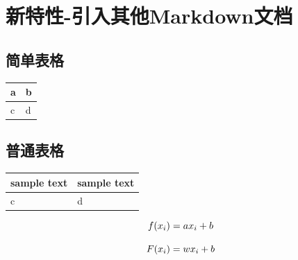 \documentclass[UTF8]{ctexart}
\newenvironment{marktext}{}{}
\renewenvironment{shaded}{
                     \def\FrameCommand{\fboxsep=\FrameSep \colorbox{shadecolor}}
                     \MakeFramed{\advance\hsize-\width \FrameRestore\FrameRestore}}
                    {\endMakeFramed}
\newlength\tablewidth
\begin{document}
\begin{marktext}


\section{新特性{-}引入其他Markdown文档}




\normalsize
\begin{marktext}


\subsection{简单表格}


\end{marktext}
\begin{center}
\setlength\tablewidth{\dimexpr (\textwidth -4\tabcolsep)}
\begin{tabular}{|p{0.500\tablewidth}<{\centering}|p{0.500\tablewidth}<{\centering}|}
\hline
\rowcolor{tabletopgray}
\textbf{a}&\textbf{b}\\
\hline
c&d\\
\hline
\end{tabular}
\end{center}
\begin{marktext}


\subsection{普通表格}


\end{marktext}
\begin{center}
\setlength\tablewidth{\dimexpr (\textwidth -4\tabcolsep)}
\begin{tabular}{|p{0.500\tablewidth}<{\centering}|p{0.500\tablewidth}<{\centering}|}
\hline
\rowcolor{tabletopgray}
\textbf{sample text }&\textbf{ sample text}\\
\hline
c&d\\
\hline
\end{tabular}
\end{center}


\normalsize


\[
f(x_i)=ax_i+b\\
\]


\begin{shaded}
\[
F(x_i) = wx_i+b\\
\]


\end{shaded}




\end{marktext}
\end{document}
